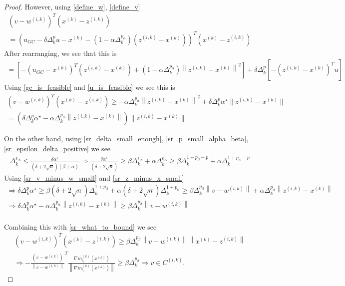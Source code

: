 \documentclass{article}
\theoremstyle{case}
\numberwithin{theorem}{subsection}
\newcommand{\dk}{\Delta_k}
\newcommand{\gmcik}{{\nabla m_{c_i}^{(k)}\left(\xk\right)}}
\newcommand{\minanglealpha}{{ \alpha^{\star} }}
\newcommand{\wik}{{w^{(i, k)}}}
\newcommand{\xk}{x^{(k)}}
\newcommand{\zik}{{z^{(i, k)}}}
\newcommand{\fik}{{C^{(i, k)}}}
\begin{document}
\begin{proof}
However, using \cref{define_w}, \cref{define_v}
\begin{align*}
\left(v - \wik \right)^T\left(\xk - \zik \right) \\
=\left( u_{GC} - \delta\dk^{p}u - \xk - \left(1 - \alpha\dk^{p_{\alpha}}\right)\left(\zik - \xk\right) \right)^T\left(\xk - \zik \right)
\end{align*}
After rearranging, we see that this is
\begin{align*}
=\left[
-\left( u_{GC}- \xk\right)^T\left(\zik - \xk \right) 
+\left(1 - \alpha\dk^{p_{\alpha}}\right)\left\|\zik - \xk\right\|^2
\right]
+ \delta\dk^{p}\left[ -\left(\zik - \xk\right)^Tu\right]
\end{align*}
Using \cref{gc_is_feasible} and \cref{u_is_feasible} we see this is
\begin{align}
\left(v - \wik \right)^T\left(\xk - \zik \right)  \ge - \alpha \dk ^{p_{\alpha}} \left\|\zik - \xk\right\|^2
+ \delta\dk^{p} \minanglealpha \|\zik - \xk\| \nonumber \\
= \left(
\delta\dk^{p} \minanglealpha
- \alpha \dk ^{p_{\alpha}} \left\|\zik - \xk\right\|
\right)\|\zik - \xk\| \label{sr_what_to_bound}
\end{align}

On the other hand, using \cref{sr_delta_small_enough}, \cref{sr_p_small_alpha_beta}, \cref{sr_epsilon_delta_positive} we see
\begin{align*}
\dk^{\epsilon_{\Delta}} \le \frac{\delta \minanglealpha}{\left(\delta + 2\sqrt{n}\right) \left(\beta +\alpha\right)} 
\Longrightarrow\frac{ \delta \minanglealpha }{\left(\delta + 2\sqrt{n}\right)} \ge \beta\dk^{\epsilon_{\Delta}} + \alpha\dk^{\epsilon_{\Delta}} 
\ge \beta \dk^{1 + p_{\beta} - p} + \alpha \dk ^{1 + p_{\alpha} - p}
\end{align*}
Using \cref{sr_v_minus_w_small} and \cref{sr_z_minus_x_small}
\begin{align*}
\Longrightarrow \delta\dk^{p} \minanglealpha  \ge \beta \left(\delta + 2\sqrt{n}\right) \dk^{1 + p_{\beta}} + \alpha\left(\delta + 2\sqrt{n}\right)  \dk ^{1 + p_{\alpha}}
\ge \beta \dk^{p_{\beta}}\left\|v - \wik\right\| + \alpha \dk ^{p_{\alpha}} \left\|\zik - \xk\right\|\\
\Longrightarrow \delta\dk^{p} \minanglealpha - \alpha \dk ^{p_{\alpha}} \left\|\zik - \xk\right\|  \ge \beta \dk^{p_{\beta}}\left\|v - \wik\right\| \\
\end{align*}

Combining this with \cref{sr_what_to_bound} we see
\begin{align*}
\left(v - \wik \right)^T\left(\xk - \zik \right) \ge \beta \dk^{p_{\beta}}\left\|v - \wik\right\| \left\|\xk - \zik\right\| \\
\Longrightarrow -\frac {\left(v - \wik \right)}{\left\|v - \wik \right\|}^T\frac{\gmcik}{\left\|\gmcik\right\|}\ge\beta \dk^{p_{\beta}} 
\Longrightarrow v \in \fik.
\end{align*}
\end{proof}
\end{document}
